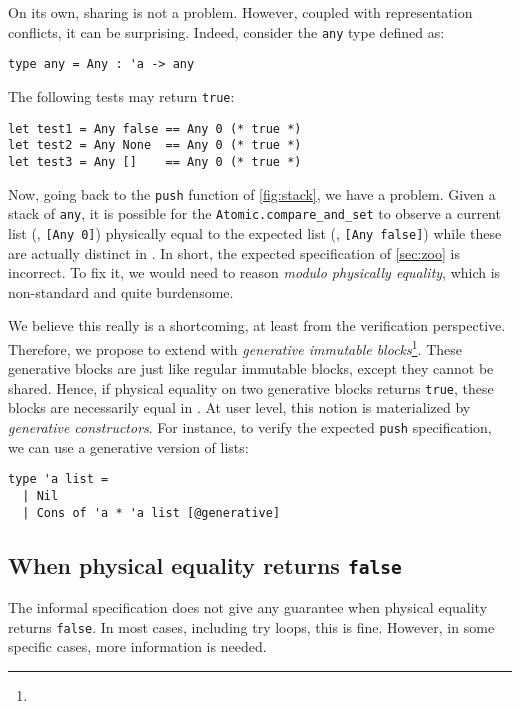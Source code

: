 On its own, sharing is not a problem.
However, coupled with representation conflicts, it can be surprising.
Indeed, consider the \texttt{any} type defined as:
\begin{verbatim}
type any = Any : 'a -> any
\end{verbatim}

The following tests may return \texttt{true}:
\begin{verbatim}
let test1 = Any false == Any 0 (* true *)
let test2 = Any None  == Any 0 (* true *)
let test3 = Any []    == Any 0 (* true *)
\end{verbatim}

Now, going back to the \texttt{push} function of \cref{fig:stack}, we have a problem.
Given a stack of \texttt{any}, it is possible for the \texttt{Atomic.compare_and_set} to observe a current list (\eg, \texttt{[Any 0]}) physically equal to the expected list (\eg, \texttt{[Any false]}) while these are actually distinct in \Rocq.
In short, the expected specification of \cref{sec:zoo} is incorrect.
To fix it, we would need to reason \emph{modulo physically equality}, which is non-standard and quite burdensome.

We believe this really is a shortcoming, at least from the verification perspective.
Therefore, we propose to extend \OCaml with \emph{generative immutable blocks}\footnote{}.
These generative blocks are just like regular immutable blocks, except they cannot be shared.
Hence, if physical equality on two generative blocks returns \texttt{true}, these blocks are necessarily equal in \Rocq.
At user level, this notion is materialized by \emph{generative constructors}.
For instance, to verify the expected \texttt{push} specification, we can use a generative version of lists:
\begin{verbatim}
type 'a list =
  | Nil
  | Cons of 'a * 'a list [@generative]
\end{verbatim}

\subsection{When physical equality returns \texttt{false}}



The informal \OCaml specification does not give any guarantee when physical equality returns \texttt{false}.
In most cases, including try loops, this is fine.
However, in some specific cases, more information is needed.

